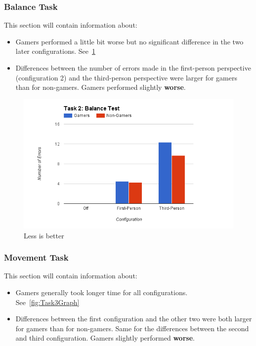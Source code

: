 \documentclass[runningheads,a4paper,oribibl]{llncs}
\begin{document}
\subsubsection{Balance Task}
This section will contain information about:
\begin{itemize}
	\item Gamers performed a little bit worse but no significant difference in the two later configurations. See~\ref{fig:Task2Graph}
	\item Differences between the number of errors made in the first-person perspective (configuration 2) and the third-person perspective were larger for gamers than for non-gamers. Gamers performed slightly \textbf{worse}.
\end{itemize}
\begin{figure}
   \centering
   \includegraphics[width=\textwidth]{ExternalMaterial/Task2Graph}
   \caption{Less is better} \label{fig:Task2Graph}
\end{figure}


\subsubsection{Movement Task}
This section will contain information about:
\begin{itemize}
	\item Gamers generally took longer time for all configurations. See~\ref{fig:Task3Graph}
	\item Differences between the first configuration and the other two were both larger for gamers than for non-gamers. Same for the differences between the second and third configuration. Gamers slightly performed \textbf{worse}.
\end{itemize}
\end{document}
